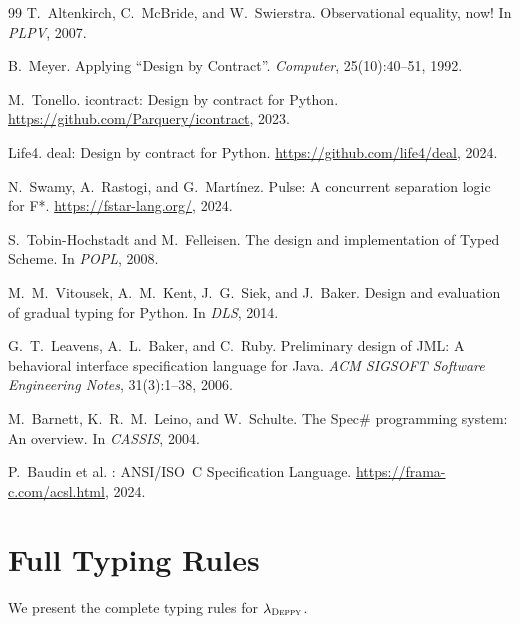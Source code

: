 \documentclass[acmsmall,nonacm,screen]{acmart}
\newcommand{\deppy}{\textsc{Deppy}}
\begin{document}
\begin{thebibliography}{99}
T.~Altenkirch, C.~McBride, and W.~Swierstra.
\newblock Observational equality, now!
\newblock In \emph{PLPV}, 2007.

B.~Meyer.
\newblock Applying ``{Design by Contract}''.
\newblock \emph{Computer}, 25(10):40--51, 1992.

M.~Tonello.
\newblock icontract: Design by contract for {Python}.
\newblock \url{https://github.com/Parquery/icontract}, 2023.

Life4.
\newblock deal: Design by contract for {Python}.
\newblock \url{https://github.com/life4/deal}, 2024.

N.~Swamy, A.~Rastogi, and G.~Mart\'inez.
\newblock Pulse: A concurrent separation logic for {F*}.
\newblock \url{https://fstar-lang.org/}, 2024.

S.~Tobin-Hochstadt and M.~Felleisen.
\newblock The design and implementation of {Typed Scheme}.
\newblock In \emph{POPL}, 2008.

M.~M.~Vitousek, A.~M.~Kent, J.~G.~Siek, and J.~Baker.
\newblock Design and evaluation of gradual typing for {Python}.
\newblock In \emph{DLS}, 2014.

G.~T.~Leavens, A.~L.~Baker, and C.~Ruby.
\newblock Preliminary design of {JML}: A behavioral interface specification
  language for {Java}.
\newblock \emph{ACM SIGSOFT Software Engineering Notes}, 31(3):1--38, 2006.

M.~Barnett, K.~R.~M.~Leino, and W.~Schulte.
\newblock The {Spec\#} programming system: An overview.
\newblock In \emph{CASSIS}, 2004.

P.~Baudin et al.
: {ANSI/ISO~C} Specification Language.
\newblock \url{https://frama-c.com/acsl.html}, 2024.

\end{thebibliography}


\appendix

\section{Full Typing Rules}\label{app:rules}

We present the complete typing rules for $\lambda_{\deppy}$.
\end{document}
